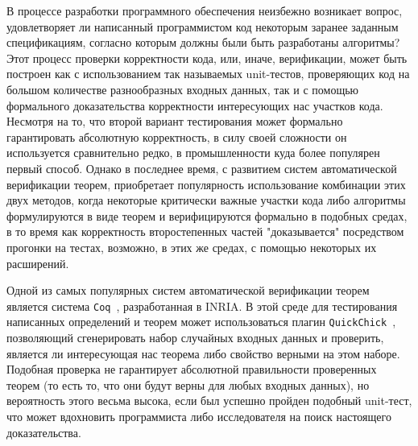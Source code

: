 



\usepackage{tikz}
\usepackage{float}
\usetikzlibrary{arrows}


\DeclareMathOperator{\bttr}{T\_tr}
\DeclareMathOperator{\btnil}{T\_nil}

\newcommand{\tbttr}{T\_tr}
\newcommand{\tcoq}{\texttt{Coq}~}
\newcommand{\tqc}{\texttt{QuickChick}~}



\Intro

В процессе разработки программного обеспечения неизбежно возникает вопрос, удовлетворяет ли написанный программистом код некоторым заранее заданным спецификациям, согласно которым должны были быть разработаны алгоритмы? Этот процесс проверки корректности кода, или, иначе, верификации, может быть построен как с использованием так называемых unit-тестов, проверяющих код на большом количестве разнообразных входных данных, так и с помощью формального доказательства корректности интересующих нас участков кода. Несмотря на то, что второй вариант тестирования может формально гарантировать абсолютную корректность, в силу своей сложности он используется сравнительно редко, в промышленности куда более популярен первый способ. Однако в последнее время, с развитием систем автоматической верификации теорем, приобретает популярность использование комбинации этих двух методов, когда некоторые критически важные участки кода либо алгоритмы формулируются в виде теорем и верифицируются формально в подобных средах, в то время как корректность второстепенных частей "доказывается" посредством прогонки на тестах, возможно, в этих же средах, с помощью некоторых их расширений.

Одной из самых популярных систем автоматической верификации теорем является система \tcoq, разработанная в INRIA. В этой среде для тестирования написанных определений и теорем может использоваться плагин \tqc, позволяющий сгенерировать набор случайных входных данных и проверить, является ли интересующая нас теорема либо свойство верными на этом наборе. Подобная проверка не гарантирует абсолютной правильности проверенных теорем (то есть то, что они будут верны для любых входных данных), но вероятность этого весьма высока, если был успешно пройден подобный unit-тест, что может вдохновить программиста либо исследователя на поиск настоящего доказательства.

